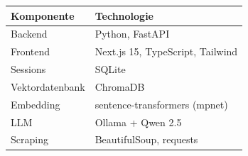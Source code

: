 \begin{tabularx}{\textwidth}{@{}l X@{}}
\toprule
\textbf{Komponente} & \textbf{Technologie} \\
\midrule
Backend & Python, FastAPI \\
Frontend & Next.js 15, TypeScript, Tailwind \\
Sessions & SQLite \\
Vektordatenbank & ChromaDB \\
Embedding & sentence-transformers (mpnet) \\
LLM & Ollama + Qwen 2.5 \\
Scraping & BeautifulSoup, requests \\
\bottomrule
\end{tabularx}
